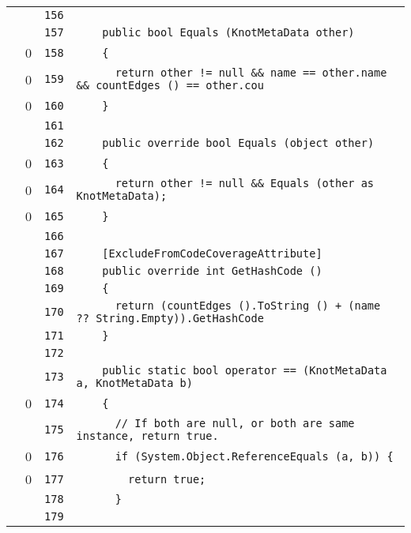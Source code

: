 \documentclass[a4paper,10pt]{article}
\begin{document}
\begin{longtable}[l]{lrrl}
\cellcolor{gray} &  & \verb~156~ & \verb~~\\
\cellcolor{gray} &  & \verb~157~ & \verb~    public bool Equals (KnotMetaData other)~\\
\cellcolor{red} & 0 & \verb~158~ & \verb~    {~\\
\cellcolor{red} & 0 & \verb~159~ & \verb~      return other != null && name == other.name && countEdges () == other.cou~\\
\cellcolor{red} & 0 & \verb~160~ & \verb~    }~\\
\cellcolor{gray} &  & \verb~161~ & \verb~~\\
\cellcolor{gray} &  & \verb~162~ & \verb~    public override bool Equals (object other)~\\
\cellcolor{red} & 0 & \verb~163~ & \verb~    {~\\
\cellcolor{red} & 0 & \verb~164~ & \verb~      return other != null && Equals (other as KnotMetaData);~\\
\cellcolor{red} & 0 & \verb~165~ & \verb~    }~\\
\cellcolor{gray} &  & \verb~166~ & \verb~~\\
\cellcolor{gray} &  & \verb~167~ & \verb~    [ExcludeFromCodeCoverageAttribute]~\\
\cellcolor{gray} &  & \verb~168~ & \verb~    public override int GetHashCode ()~\\
\cellcolor{gray} &  & \verb~169~ & \verb~    {~\\
\cellcolor{gray} &  & \verb~170~ & \verb~      return (countEdges ().ToString () + (name ?? String.Empty)).GetHashCode ~\\
\cellcolor{gray} &  & \verb~171~ & \verb~    }~\\
\cellcolor{gray} &  & \verb~172~ & \verb~~\\
\cellcolor{gray} &  & \verb~173~ & \verb~    public static bool operator == (KnotMetaData a, KnotMetaData b)~\\
\cellcolor{red} & 0 & \verb~174~ & \verb~    {~\\
\cellcolor{gray} &  & \verb~175~ & \verb~      // If both are null, or both are same instance, return true.~\\
\cellcolor{red} & 0 & \verb~176~ & \verb~      if (System.Object.ReferenceEquals (a, b)) {~\\
\cellcolor{red} & 0 & \verb~177~ & \verb~        return true;~\\
\cellcolor{gray} &  & \verb~178~ & \verb~      }~\\
\cellcolor{gray} &  & \verb~179~ & \verb~~\\

\end{longtable}
\end{document}
